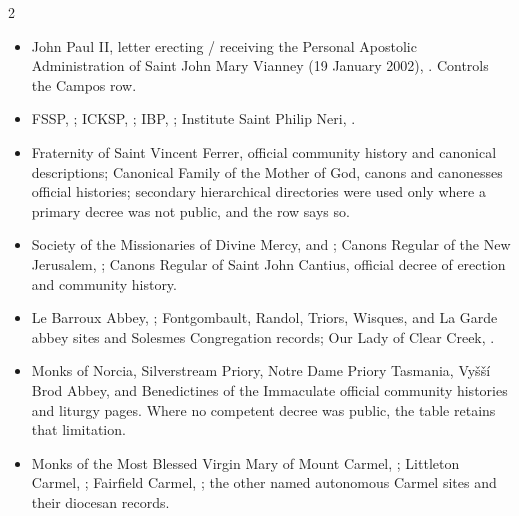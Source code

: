 \begin{multicols}{2}
\begin{itemize}[itemsep=0.12em,topsep=0.15em]
\item John Paul II, letter erecting / receiving the Personal Apostolic Administration of Saint John Mary Vianney (19 January 2002), . Controls the Campos row.
\item FSSP, ; ICKSP, ; IBP, ; Institute Saint Philip Neri, .
\item Fraternity of Saint Vincent Ferrer, official community history and canonical descriptions; Canonical Family of the Mother of God, canons and canonesses official histories; secondary hierarchical directories were used only where a primary decree was not public, and the row says so.
\item Society of the Missionaries of Divine Mercy,  and ; Canons Regular of the New Jerusalem, ; Canons Regular of Saint John Cantius, official decree of erection and community history.
\item Le Barroux Abbey, ; Fontgombault, Randol, Triors, Wisques, and La Garde abbey sites and Solesmes Congregation records; Our Lady of Clear Creek, .
\item Monks of Norcia, Silverstream Priory, Notre Dame Priory Tasmania, Vyšší Brod Abbey, and Benedictines of the Immaculate official community histories and liturgy pages. Where no competent decree was public, the table retains that limitation.
\item Monks of the Most Blessed Virgin Mary of Mount Carmel, ; Littleton Carmel, ; Fairfield Carmel, ; the other named autonomous Carmel sites and their diocesan records.

\end{itemize}
\end{multicols}
